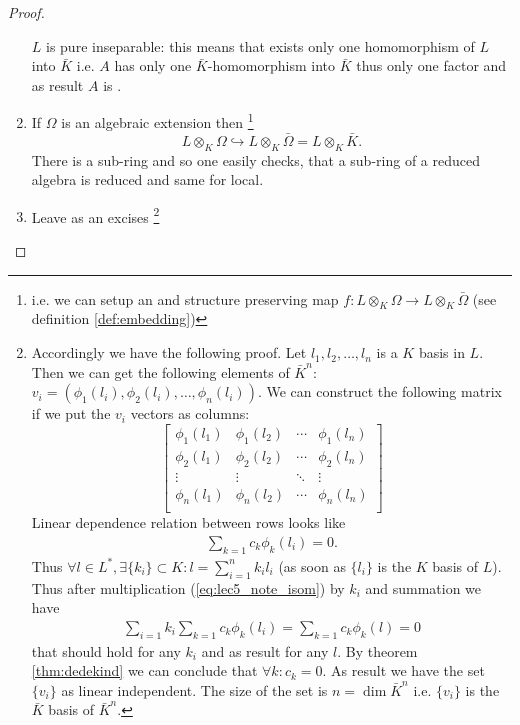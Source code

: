 \begin{theorem}
\begin{proof}
\begin{enumerate}
      $L$ is pure inseparable: this means that exists only one
      homomorphism of $L$ into $\bar{K}$ i.e. $A$ has only one
      $\bar{K}$-homomorphism into $\bar{K}$ thus only one factor and
      as result $A$ is .
    \item If $\Omega$ is an algebraic extension then
      \footnote {
        i.e. we can setup an  and structure
        preserving map $f: L \otimes_K \Omega \to L \otimes_K
        \bar{\Omega}$ (see definition \ref{def:embedding}) 
      }
      \[
      L \otimes_K \Omega \hookrightarrow L \otimes_K \bar{\Omega} =
      L \otimes_K \bar{K}.
      \]
      There is a sub-ring and so one easily checks, that a sub-ring of
      a reduced algebra is reduced and same for local.  
    \item Leave as an excises
      \footnote{
        Accordingly \cite{mathstackexchange:tensorproduct} we have the
        following proof.
        Let $l_1, l_2, \dots, l_n$ is a $K$ basis in $L$.
        Then we can
        get the following elements of $\bar{K}^n$:
        $v_i = \left(\phi_1(l_i), \phi_2(l_i), \dots,
        \phi_n(l_i)\right)$. We can construct the following matrix if
        we put the $v_i$ vectors as columns:
        \[
        \begin{bmatrix}
          \phi_1(l_1) & \phi_1(l_2) & \cdots & \phi_1(l_n) \\
          \phi_2(l_1) & \phi_2(l_2) & \cdots & \phi_2(l_n) \\
          \vdots & \vdots & \ddots & \vdots \\
          \phi_n(l_1) & \phi_n(l_2) & \cdots & \phi_n(l_n) \\
        \end{bmatrix}
        \]
        Linear dependence relation between rows looks like
        \begin{eqnarray}
          \sum_{k=1} c_k \phi_k(l_i) = 0.
          \label{eq:lec5_note_isom}
        \end{eqnarray}
        Thus $\forall l \in L^\ast, \exists \{k_i\} \subset K: l =
        \sum_{i=1}^nk_i l_i$ (as soon as $\{l_i\}$ is the $K$ basis of
        $L$). Thus after multiplication (\ref{eq:lec5_note_isom}) by
        $k_i$ and summation we have
        \begin{eqnarray}
         \sum_{i=1} k_i \sum_{k=1} c_k \phi_k(l_i) =
        \sum_{k=1} c_k \phi_k(l) = 0
        \nonumber
        \end{eqnarray}
        that should hold for any $k_i$ and as result for any $l$. By
        theorem \ref{thm:dedekind} we can conclude that $\forall k:
        c_k = 0$. As result we have the set $\{v_i\}$ as linear
        independent. The size of the set is $n = \dim \bar{K}^n$
        i.e. $\{v_i\}$ is the $\bar{K}$ basis of $\bar{K}^n$.
      }
    \end{enumerate}
  \end{proof}
\end{theorem}
